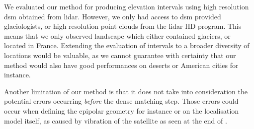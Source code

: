 We evaluated our method for producing elevation intervals using high resolution \acrshort{dsm} obtained from \acrshort{lidar}. However, we only had access to \acrshort{dsm} provided glaciologists, or high resolution point clouds from the \acrshort{lidar} HD program. This means that we only observed landscape which either contained glaciers, or located in France. Extending the evaluation of intervals to a broader diversity of locations would be valuable, as we cannot guarantee with certainty that our method would also have good performances on deserts or American cities for instance. 

Another limitation of our method is that it does not take into consideration the potential errors occurring \textit{before} the dense matching step. Those errors could occur when defining the epipolar geometry for instance or on the localisation model itself, as caused by vibration of the satellite as seen at the end of  . 

